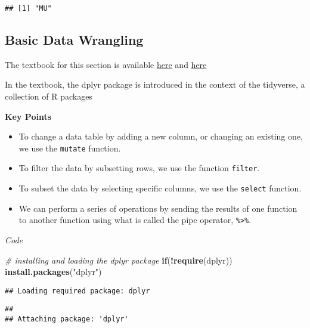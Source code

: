 \documentclass[]{article}
\newenvironment{Shaded}{\begin{snugshade}}{\end{snugshade}}
\newcommand{\CommentTok}[1]{\textcolor[rgb]{0.56,0.35,0.01}{\textit{#1}}}
\newcommand{\ControlFlowTok}[1]{\textcolor[rgb]{0.13,0.29,0.53}{\textbf{#1}}}
\newcommand{\KeywordTok}[1]{\textcolor[rgb]{0.13,0.29,0.53}{\textbf{#1}}}
\newcommand{\NormalTok}[1]{#1}
\newcommand{\OperatorTok}[1]{\textcolor[rgb]{0.81,0.36,0.00}{\textbf{#1}}}
\newcommand{\StringTok}[1]{\textcolor[rgb]{0.31,0.60,0.02}{#1}}
\providecommand{\tightlist}{%
  \setlength{\itemsep}{0pt}\setlength{\parskip}{0pt}}
\begin{document}
\begin{verbatim}
## [1] "MU"
\end{verbatim}

\hypertarget{basic-data-wrangling}{%
\subsection{Basic Data Wrangling}\label{basic-data-wrangling}}

The textbook for this section is available
\href{https://rafalab.github.io/dsbook/tidyverse.html\#manipulating-data-frames}{here}
and
\href{https://rafalab.github.io/dsbook/tidyverse.html\#the-pipe}{here}

In the textbook, the dplyr package is introduced in the context of the
tidyverse, a collection of R packages

\textbf{Key Points}

\begin{itemize}
\tightlist
\item
  To change a data table by adding a new column, or changing an existing
  one, we use the \texttt{mutate} function.
\item
  To filter the data by subsetting rows, we use the function
  \texttt{filter}.
\item
  To subset the data by selecting specific columns, we use the
  \texttt{select} function.
\item
  We can perform a series of operations by sending the results of one
  function to another function using what is called the pipe operator,
  \texttt{\%\textgreater{}\%}.
\end{itemize}

\emph{Code}

\begin{Shaded}
\begin{Highlighting}[]
\CommentTok{# installing and loading the dplyr package}
\ControlFlowTok{if}\NormalTok{(}\OperatorTok{!}\KeywordTok{require}\NormalTok{(dplyr)) }\KeywordTok{install.packages}\NormalTok{(}\StringTok{"dplyr"}\NormalTok{)}
\end{Highlighting}
\end{Shaded}

\begin{verbatim}
## Loading required package: dplyr
\end{verbatim}

\begin{verbatim}
## 
## Attaching package: 'dplyr'
\end{verbatim}
\end{document}
